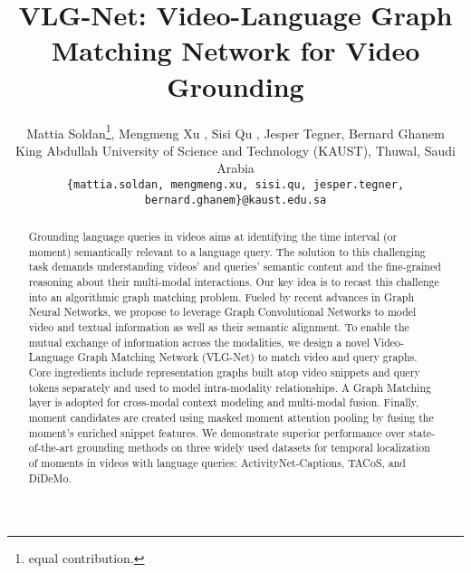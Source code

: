 \documentclass[10pt,twocolumn,letterpaper]{article}
\newcommand*\samethanks[1][\value{footnote}]{\footnotemark[#1]}
\begin{document}
\title{VLG-Net: Video-Language Graph Matching Network for Video Grounding}

{\author{
Mattia Soldan\thanks{equal contribution.}, 
\quad Mengmeng Xu \samethanks, 
\quad Sisi Qu \samethanks, 
\quad Jesper Tegner, 
\quad Bernard Ghanem\\
King Abdullah University of Science and Technology (KAUST), Thuwal, Saudi Arabia\\
{\tt\small \{mattia.soldan, mengmeng.xu, sisi.qu, jesper.tegner, bernard.ghanem\}@kaust.edu.sa}}}

\maketitle
\ificcvfinal\thispagestyle{empty}\fi

\begin{abstract}
Grounding language queries in videos aims at identifying the time interval (or moment) semantically relevant to a language query. The solution to this challenging task demands understanding videos' and queries' semantic content and the fine-grained reasoning about their multi-modal interactions. Our key idea is to recast this challenge into an algorithmic graph matching problem. Fueled by recent advances in Graph Neural Networks, we propose to leverage Graph Convolutional Networks to model video and textual information as well as their semantic alignment. To enable the mutual exchange of information across the modalities, we design a novel Video-Language Graph Matching Network (VLG-Net) to match video and query graphs. Core ingredients include representation graphs built atop video snippets and query tokens separately and used to model intra-modality relationships. A Graph Matching layer is adopted for cross-modal context modeling and multi-modal fusion. Finally, moment candidates are created using masked moment attention pooling by fusing the moment's enriched snippet features. We demonstrate superior performance over state-of-the-art grounding methods on three widely used datasets for temporal localization of moments in videos with language queries: ActivityNet-Captions, TACoS, and DiDeMo.
\end{abstract} \vspace{-0.3cm}
\end{document}
